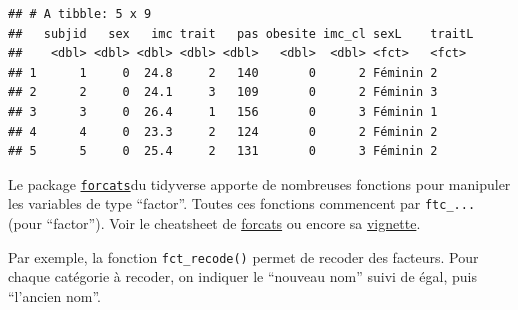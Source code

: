 \documentclass[
]{book}
\newenvironment{Shaded}{\begin{snugshade}}{\end{snugshade}}
\newcommand{\AttributeTok}[1]{\textcolor[rgb]{0.13,0.29,0.53}{#1}}
\newcommand{\CommentTok}[1]{\textcolor[rgb]{0.56,0.35,0.01}{\textit{#1}}}
\newcommand{\DecValTok}[1]{\textcolor[rgb]{0.00,0.00,0.81}{#1}}
\newcommand{\DocumentationTok}[1]{\textcolor[rgb]{0.56,0.35,0.01}{\textbf{\textit{#1}}}}
\newcommand{\FunctionTok}[1]{\textcolor[rgb]{0.13,0.29,0.53}{\textbf{#1}}}
\newcommand{\NormalTok}[1]{#1}
\newcommand{\OtherTok}[1]{\textcolor[rgb]{0.56,0.35,0.01}{#1}}
\newcommand{\SpecialCharTok}[1]{\textcolor[rgb]{0.81,0.36,0.00}{\textbf{#1}}}
\newcommand{\StringTok}[1]{\textcolor[rgb]{0.31,0.60,0.02}{#1}}
\begin{document}
\begin{Shaded}
\end{Shaded}

\begin{verbatim}
## # A tibble: 5 x 9
##   subjid   sex   imc trait   pas obesite imc_cl sexL    traitL
##    <dbl> <dbl> <dbl> <dbl> <dbl>   <dbl>  <dbl> <fct>   <fct> 
## 1      1     0  24.8     2   140       0      2 Féminin 2     
## 2      2     0  24.1     3   109       0      2 Féminin 3     
## 3      3     0  26.4     1   156       0      3 Féminin 1     
## 4      4     0  23.3     2   124       0      2 Féminin 2     
## 5      5     0  25.4     2   131       0      3 Féminin 2
\end{verbatim}

Le package \href{https://forcats.tidyverse.org/index.html}{\texttt{forcats}}du tidyverse apporte de nombreuses fonctions pour manipuler les variables de type ``factor''. Toutes ces fonctions commencent par \texttt{ftc\_...} (pour ``factor''). Voir le cheatsheet de \href{https://raw.githubusercontent.com/rstudio/cheatsheets/main/factors.pdf}{forcats} ou encore sa \href{https://forcats.tidyverse.org/articles/forcats.html}{vignette}.

Par exemple, la fonction \texttt{fct\_recode()} permet de recoder des facteurs. Pour chaque catégorie à recoder, on indiquer le ``nouveau nom'' suivi de égal, puis ``l'ancien nom''.
\end{document}
